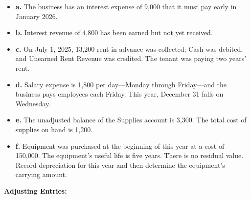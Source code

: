 \documentclass[12pt,a4paper]{book}
\begin{document}
\begin{itemize}
    \item \textbf{a.} The business has an interest expense of 9,000 that it must pay early in January 2026.
    \item \textbf{b.} Interest revenue of 4,800 has been earned but not yet received.
    \item \textbf{c.} On July 1, 2025, 13,200 rent in advance was collected; Cash was debited, and Unearned Rent Revenue was credited. The tenant was paying two years' rent.
    \item \textbf{d.} Salary expense is 1,800 per day—Monday through Friday—and the business pays employees each Friday. This year, December 31 falls on Wednesday.
    \item \textbf{e.} The unadjusted balance of the Supplies account is 3,300. The total cost of supplies on hand is 1,200.
    \item \textbf{f.} Equipment was purchased at the beginning of this year at a cost of 150,000. The equipment's useful life is five years. There is no residual value. Record depreciation for this year and then determine the equipment's carrying amount.
\end{itemize}

\vspace{0.5cm}
\textbf{Adjusting Entries:}
\end{document}
